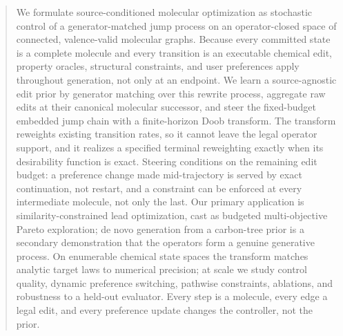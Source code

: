\begin{abstract}
We formulate source-conditioned molecular optimization as stochastic control of a
generator-matched jump process on an operator-closed space of connected, valence-valid molecular
graphs. Because every committed state is a complete molecule and every transition is an executable
chemical edit, property oracles, structural constraints, and user preferences apply throughout
generation, not only at an endpoint. We learn a source-agnostic edit prior by generator
matching over this rewrite process, aggregate raw edits at their canonical molecular successor, and
steer the fixed-budget embedded jump chain with a finite-horizon Doob transform. The
transform reweights existing transition rates, so it cannot leave the legal operator support, and it
realizes a specified terminal reweighting exactly when its desirability function is exact. Steering
conditions on the remaining edit budget: a preference change made mid-trajectory is served by exact
continuation, not restart, and a constraint can be enforced at every intermediate molecule, not only
the last. Our primary application is similarity-constrained lead optimization, cast as budgeted
multi-objective Pareto exploration; de novo generation from a carbon-tree prior is a secondary
demonstration that the operators form a genuine generative process. On enumerable
chemical state spaces the transform matches analytic target laws to numerical precision; at scale we
study control quality, dynamic preference switching, pathwise constraints, ablations, and robustness to a
held-out evaluator. Every step is a molecule, every edge a legal edit, and every preference update changes
the controller, not the prior.
\end{abstract}
